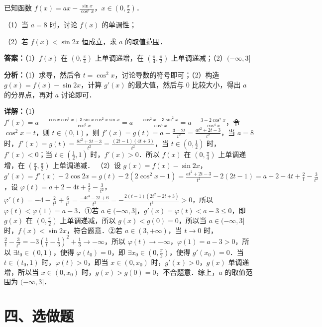 \begin{question}[points=12]
已知函数 $f(x) = ax - \frac{\sin x}{\cos^3 x}$，$x \in \left(0, \frac{\pi}{2}\right)$．

（1）当 $a=8$ 时，讨论 $f(x)$ 的单调性；

（2）若 $f(x) < \sin 2x$ 恒成立，求 $a$ 的取值范围．
\begin{solution}
\textbf{答案：}（1）$f(x)$ 在 $(0,\frac{\pi}{4})$ 上单调递增，在 $(\frac{\pi}{4},\frac{\pi}{2})$ 上单调递减；（2）$(-\infty,3]$

\textbf{分析：}（1）求导，然后令 $t=\cos^2 x$，讨论导数的符号即可；（2）构造 $g(x)=f(x)-\sin 2x$，计算 $g'(x)$ 的最大值，然后与 0 比较大小，得出 $a$ 的分界点，再对 $a$ 讨论即可．

\textbf{详解：}（1）$f'(x) = a - \frac{\cos x \cos^3 x + 3\sin x \cos^2 x \sin x}{\cos^6 x} = a - \frac{\cos^2 x + 3\sin^2 x}{\cos^4 x} = a - \frac{3-2\cos^2 x}{\cos^4 x}$，令 $\cos^2 x = t$，则 $t\in(0,1)$，则 $f'(x) = g(t) = a - \frac{3-2t}{t^2} = \frac{at^2+2t-3}{t^2}$，当 $a=8$ 时，$f'(x) = g(t) = \frac{8t^2+2t-3}{t^2} = \frac{(2t-1)(4t+3)}{t^2}$，当 $t\in(0,\frac{1}{2})$ 时，$f'(x)<0$；当 $t\in(\frac{1}{2},1)$ 时，$f'(x)>0$．所以 $f(x)$ 在 $(0,\frac{\pi}{4})$ 上单调递增，在 $(\frac{\pi}{4},\frac{\pi}{2})$ 上单调递减．
（2）设 $g(x)=f(x)-\sin 2x$，$g'(x)=f'(x)-2\cos 2x = g(t) - 2(2\cos^2 x -1) = \frac{at^2+2t-3}{t^2} - 2(2t-1) = a+2 - 4t + \frac{2}{t} - \frac{3}{t^2}$，设 $\varphi(t)=a+2-4t+\frac{2}{t}-\frac{3}{t^2}$，$\varphi'(t)=-4-\frac{2}{t^2}+\frac{6}{t^3} = \frac{-4t^3-2t+6}{t^3} = -\frac{2(t-1)(2t^2+2t+3)}{t^3}>0$，所以 $\varphi(t)<\varphi(1)=a-3$．①若 $a\in(-\infty,3]$，$g'(x)=\varphi(t)<a-3\le0$，即 $g(x)$ 在 $(0,\frac{\pi}{2})$ 上单调递减，所以 $g(x)<g(0)=0$，所以当 $a\in(-\infty,3]$ 时，$f(x)<\sin 2x$，符合题意．②若 $a\in(3,+\infty)$，当 $t\to0$ 时，$\frac{2}{t}-\frac{3}{t^2} = -3\left(\frac{1}{t}-\frac{1}{3}\right)^2+\frac{1}{3} \to -\infty$，所以 $\varphi(t)\to -\infty$，$\varphi(1)=a-3>0$，所以 $\exists t_0\in(0,1)$，使得 $\varphi(t_0)=0$，即 $\exists x_0\in(0,\frac{\pi}{2})$，使得 $g'(x_0)=0$．当 $t\in(t_0,1)$ 时，$\varphi(t)>0$，即当 $x\in(0,x_0)$ 时，$g'(x)>0$，$g(x)$ 单调递增，所以当 $x\in(0,x_0)$ 时，$g(x)>g(0)=0$，不合题意．综上，$a$ 的取值范围为 $(-\infty,3]$．
\end{solution}
\end{question}

\section*{四、选做题}

